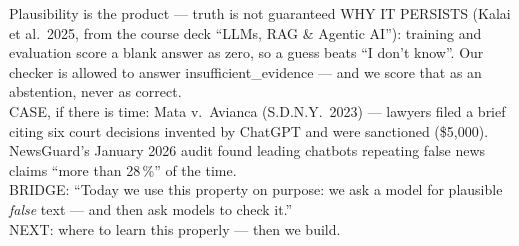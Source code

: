 \begin{frame}{Plausibility is the product --- truth is not guaranteed}
{WHY IT PERSISTS (Kalai et al.\ 2025, from the course deck ``LLMs, RAG \& Agentic AI''): training and
evaluation score a blank answer as zero, so a guess beats ``I don't know''. Our checker is allowed to
answer insufficient\_evidence --- and we score that as an abstention, never as correct.\\
CASE, if there is time: Mata v.\ Avianca (S.D.N.Y.\ 2023) --- lawyers filed a brief citing six court
decisions invented by ChatGPT and were sanctioned (\$5{,}000). NewsGuard's January 2026 audit found
leading chatbots repeating false news claims ``more than 28\,\%'' of the time.\\
BRIDGE: ``Today we use this property on purpose: we ask a model for plausible \emph{false} text --- and
then ask models to check it.''\\
NEXT: where to learn this properly --- then we build.}
\end{frame}

